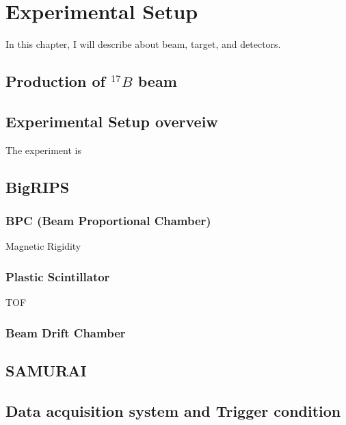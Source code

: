 \chapter{Experimental Setup}
In this chapter, I will describe about beam, target, and detectors. 
\section{Production of  ${}^{17}B$ beam}

\section{Experimental Setup overveiw}
The experiment is 
\section{BigRIPS}
\subsection{BPC (Beam Proportional Chamber)}
Magnetic Rigidity 
\subsection{Plastic Scintillator}
TOF
\subsection{Beam Drift Chamber}


\section{SAMURAI}
\section{Data acquisition system and Trigger condition}